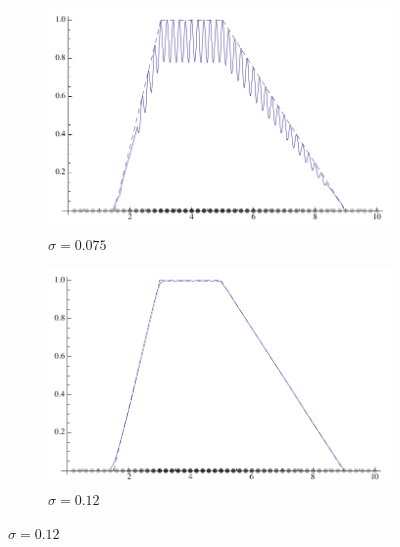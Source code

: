 \documentclass[a4paper,12pt]{report}
\begin{document}
\begin{figure}[h]
    \begin{subfigure}[t]{0.32\textwidth}
       \centering
       \includegraphics[scale=0.18]{images/parametro_sigma_1.png}
       \caption{$\sigma = 0.075 $}
       \label{fig:sigma_1}

    \end{subfigure}
    \begin{subfigure}[t]{0.32\textwidth}
        \centering
        \includegraphics[scale=0.18]{images/parametro_sigma_2.png} 
        \caption{$\sigma = 0.12 $}
        \label{fig:sigma_2}


\end{subfigure}
\end{figure}
\end{document}
